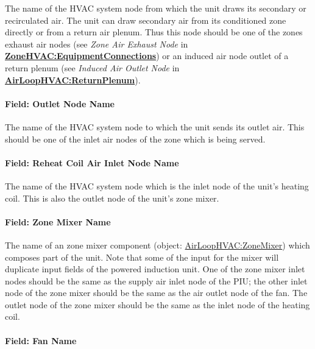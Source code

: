 The name of the HVAC system node from which the unit draws its secondary or recirculated air. The unit can draw secondary air from its conditioned zone directly or from a return air plenum. Thus this node should be one of the zones exhaust air nodes (see \emph{Zone Air Exhaust Node} in \textbf{\hyperref[zonehvacequipmentconnections]{ZoneHVAC:EquipmentConnections}}) or an induced air node outlet of a return plenum (see \emph{Induced Air Outlet Node} in \textbf{\hyperref[airloophvacreturnplenum]{AirLoopHVAC:ReturnPlenum}}).

\paragraph{Field: Outlet Node Name}\label{field-outlet-node-name-1}

The name of the HVAC system node to which the unit sends its outlet air. This should be one of the inlet air nodes of the zone which is being served.

\paragraph{Field: Reheat Coil Air Inlet Node Name}\label{field-reheat-coil-air-inlet-node-name-1}

The name of the HVAC system node which is the inlet node of the unit's heating coil. This is also the outlet node of the unit's zone mixer.

\paragraph{Field: Zone Mixer Name}\label{field-zone-mixer-name-1}

The name of an zone mixer component (object: \hyperref[airloophvaczonemixer]{AirLoopHVAC:ZoneMixer}) which composes part of the unit. Note that some of the input for the mixer will duplicate input fields of the powered induction unit. One of the zone mixer inlet nodes should be the same as the supply air inlet node of the PIU; the other inlet node of the zone mixer should be the same as the air outlet node of the fan. The outlet node of the zone mixer should be the same as the inlet node of the heating coil.

\paragraph{Field: Fan Name}\label{field-fan-name-2}

